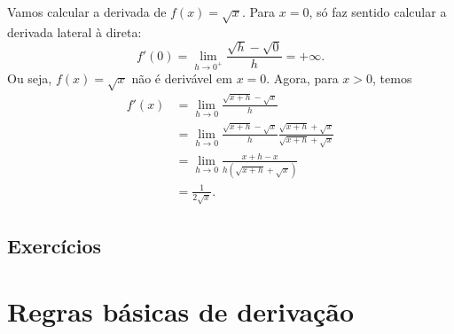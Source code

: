 \begin{ex}
  Vamos calcular a derivada de $f(x) = \sqrt{x}$. Para $x=0$, só faz sentido calcular a derivada lateral à direta:
  \begin{equation}
    f'(0) = \lim_{h\to 0^+} \frac{\sqrt{h}-\sqrt{0}}{h} = +\infty.
  \end{equation}
  Ou seja, $f(x) = \sqrt{x}$ não é derivável em $x=0$. Agora, para $x> 0$, temos
  \begin{align}
    f'(x) &= \lim_{h\to 0} \frac{\sqrt{x+h}-\sqrt{x}}{h}\\
          &= \lim_{h\to 0} \frac{\sqrt{x+h}-\sqrt{x}}{h}\frac{\sqrt{x+h}+\sqrt{x}}{\sqrt{x+h}+\sqrt{x}}\\
          &= \lim_{h\to 0} \frac{x+h-x}{h(\sqrt{x+h}+\sqrt{x})}\\
          &= \frac{1}{2\sqrt{x}}.
  \end{align}
\end{ex}

\subsection*{Exercícios}

\emconstrucao


\section{Regras básicas de derivação}\label{cap_deriv_sec_regras}

